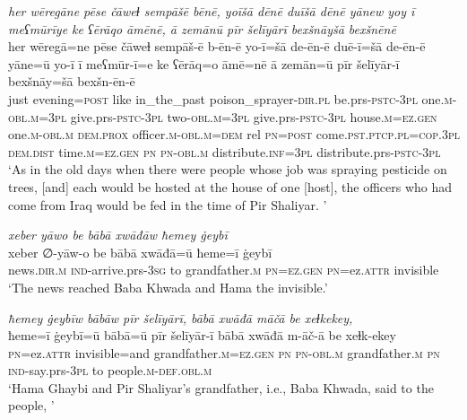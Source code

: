 \ea \label{BP.40}
\textit{her wēregāne pēse čāweɫ sempāšē bēnē, yoīšā dēnē duīšā dēnē yānew yoy ī meʕmūrīye ke ʕērāqo āmēnē, ā zemānū pīr šelīyārī bexšnāyšā bexšnēnē} \\ 
\gll her wēregā=ne pēse čāweɫ sempāš-ē b-ēn-ē yo-ī=šā de-ēn-ē duē-ī=šā de-ēn-ē yāne=ū yo-ī ī meʕmūr-ī=e ke ʕērāq=o āmē=nē ā zemān=ū pīr šelīyār-ī bexšnāy=šā bexšn-ēn-ē \\ 
 just evening\textsc{=\textsc{post}} like in\_the\_past poison\_sprayer\textsc{-dir}\textsc{.pl} be.prs\textsc{-pstc}\textsc{-3pl} one\textsc{.m}\textsc{-obl}\textsc{.m}\textsc{=3pl} give.prs\textsc{-pstc}\textsc{-3pl} two\textsc{-obl}\textsc{.m}\textsc{=3pl} give.prs\textsc{-pstc}\textsc{-3pl} house\textsc{.m}\textsc{=ez.gen} one\textsc{.m}\textsc{-obl}\textsc{.m} \textsc{dem.prox} officer\textsc{.m}\textsc{-obl}\textsc{.m}\textsc{=dem} rel \textsc{pn}\textsc{=\textsc{post}} come\textsc{.pst}\textsc{.ptcp}\textsc{.pl}\textsc{=cop}\textsc{.3pl} \textsc{dem.dist} time\textsc{.m}\textsc{=ez.gen} \textsc{pn} \textsc{pn}\textsc{-obl}\textsc{.m} distribute\textsc{.inf}\textsc{=3pl} distribute.prs\textsc{-pstc}\textsc{-3pl} \\ 
\glt `As in the old days when there were people whose job was spraying pesticide on trees, [and] each would be hosted at the house of one [host], the officers who had come from Iraq would be fed in the time of Pir Shaliyar. '
\z 
 
\ea \label{BP.46}
\textit{xeber yāwo be bābā xwāđāw ħemey ġeybī} \\ 
\gll xeber ∅-yāw-o be bābā xwāđā=ū ħeme=ī ġeybī \\ 
 news\textsc{.dir}\textsc{.m} \textsc{ind-}arrive.prs\textsc{-3sg} to grandfather\textsc{.m} \textsc{pn}\textsc{=ez.gen} \textsc{pn}=ez.\textsc{attr} invisible \\ 
\glt `The news reached Baba Khwada and Hama the invisible.'
\z 
 
\ea \label{BP.51}
\textit{ħemey ġeybīw bābāw pīr šelīyārī, bābā xwāđā māčā be xeɫkekey,} \\ 
\gll ħeme=ī ġeybī=ū bābā=ū pīr šelīyār-ī bābā xwāđā m-āč-ā be xeɫk-ekey \\ 
 \textsc{pn}=ez.\textsc{attr} invisible=and grandfather\textsc{.m}\textsc{=ez.gen} \textsc{pn} \textsc{pn}\textsc{-obl}\textsc{.m} grandfather\textsc{.m} \textsc{pn} \textsc{ind-}say.prs\textsc{-3pl} to people\textsc{.m}\textsc{-def}\textsc{.obl}\textsc{.m} \\ 
\glt `Hama Ghaybi and Pir Shaliyar’s grandfather, i.e., Baba Khwada, said to the people, '
\z 
 
